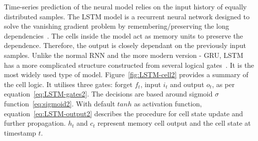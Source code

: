 Time-series prediction of the neural model relies on the input history of equally distributed samples.
The LSTM model is a recurrent neural network designed to solve the vanishing gradient problem by remembering/preserving the long dependencies~\cite{rasifaghihi_predictive_2020}.
The cells inside the model act as memory units to preserve the dependence.
Therefore, the output is closely dependant on the previously input samples.
Unlike the normal RNN and the more modern version - GRU, LSTM has a more complicated structure constructed from several logical gates~\cite{LSTM_Hochreiter1997}.
It is the most widely used type of model.
Figure~\ref{fig:LSTM-cell2} provides a summary of the cell logic.
It utilises three gates: forget $f_t$, input $i_t$ and output $o_t$, as per equation~\ref{eq:LSTM-gates2}.
The decisions are based around sigmoid $\sigma$ function~\ref{eq:sigmoid2}.
With default $tanh$ as activation function, equation~\ref{eq:LSTM-output2} describes the procedure for cell state update and further propagation.
$h_t$ and $c_t$ represent memory cell output and the cell state at timestamp $t$.

